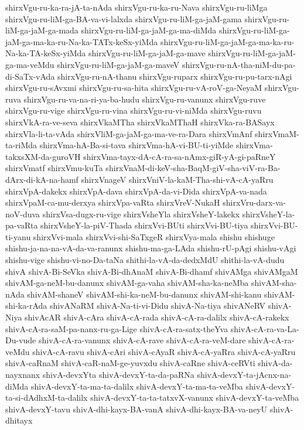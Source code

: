 {shirxVgu-ru-ka-ra-jA-ta-nAda
shirxVgu-ru-ka-ru-Nava
shirxVgu-ru-liMga
shirxVgu-ru-liM-ga-BA-va-vi-lalxda
shirxVgu-ru-liM-ga-jaM-gama
shirxVgu-ru-liM-ga-jaM-ga-mada
shirxVgu-ru-liM-ga-jaM-ga-ma-diMda
shirxVgu-ru-liM-ga-jaM-ga-ma-ka-ru-Na-ka-TATx-keSx-yiMda
shirxVgu-ru-liM-ga-jaM-ga-ma-ka-ru-Na-ka-TA-keSx-yiMda
shirxVgu-ru-liM-ga-jaM-ga-mave
shirxVgu-ru-liM-ga-jaM-ga-ma-veMdu
shirxVgu-ru-liM-ga-jaM-ga-maveV
shirxVgu-ru-nA-tha-niM-du-pa-di-SaTx-vAda
shirxVgu-ru-nA-thanu
shirxVgu-ruparx
shirxVgu-ru-pu-tarx-nAgi
shirxVgu-ru-sAvxmi
shirxVgu-ru-sa-hita
shirxVgu-ru-vA-roV-ga-NeyaM
shirxVgu-ruva
shirxVgu-ru-va-na-ri-ya-ba-hudu
shirxVgu-ru-vanunx
shirxVgu-ruve
shirxVgu-ru-vige
shirxVgu-ru-vina
shirxVgu-ru-vi-niMda
shirxVgu-ruvu
shirxVkA-ra-ve-seva
shirxVkaMTha
shirxVkaMThaH
shirxVka-ra-BASayx
shirxVla-li-ta-vAda
shirxVliM-ga-jaM-ga-ma-ve-ra-Dara
shirxVmAnf
shirxVmaM-ta-riMda
shirxVma-hA-Ba-si-tava
shirxVma-hA-vi-BU-ti-yiMde
shirxVma-takxsXM-da-guroVH
shirxVma-tayx-dA-cA-ra-sa-nAmx-giR-yA-gi-paRneY
shirxVmatf
shirxVmu-kuTa
shirxVnaM-di-keV-sha-BaqM-giV-sha-viV-ra-Ba-dArx-di-kA-na-hamf
shirxVnageV
shirxVniV-la-kaM-Tha-shi-vA-cA-yaRru
shirxVpA-dakekx
shirxVpA-dava
shirxVpA-da-vi-Dida
shirxVpA-va-nada
shirxVpaM-ca-mu-derxya
shirxVpa-vaRta
shirxVreV-NukaH
shirxVru-darx-va-noV-duva
shirxVsa-dugx-ru-vige
shirxVsheYla
shirxVsheY-lakekx
shirxVsheY-la-pa-vaRta
shirxVsheY-la-piV-Thada
shirxVvi-BUti
shirxVvi-BU-tiya
shirxVvi-BU-ti-yanu
shirxVvi-mala
shirxVvi-shi-SaTxgeR
shirxVya-mala
shishu
shishuge
shishu-ja-na-na-vA-da-va-ranunx
shishu-ma-ga-LAda
shishu-rU-pAgi
shishu-vAgi
shishu-vige
shishu-vi-no-Da-taNa
shithi-la-vA-da-dedxMdU
shithi-la-vA-dudu
shivA
shivA-Bi-SeVka
shivA-Bi-dhAnaM
shivA-Bi-dhamf
shivAMga
shivAMgaM
shivAM-ga-neM-bu-danunx
shivAM-ga-vaha
shivAM-sha-ka-neMba
shivAM-sha-nAda
shivAM-shaneV
shivAM-shi-ka-neM-bu-danunx
shivAM-shi-kanu
shivAM-shi-ka-rAda
shivANaRM
shivA-Na-ti-vi-Didu
shivA-Na-tiya
shivANeRV
shivA-Niya
shivAcAR
shivA-cAra
shivA-cA-rada
shivA-cA-ra-dalilx
shivA-cA-rakekx
shivA-cA-ra-saM-pa-nanx-ru-ga-Lige
shivA-cA-ra-satx-theYva
shivA-cA-ra-va-La-Du-vude
shivA-cA-ra-vanunx
shivA-cA-rave
shivA-cA-ra-veM-dare
shivA-cA-ra-veMdu
shivA-cA-ravu
shivA-cAri
shivA-cAyaR
shivA-cA-yaRra
shivA-cA-yaRru
shivA-caRnaM
shivA-caR-naM-ge-yuvxdu
shivA-caRne
shivA-ceRVti
shivA-da-nayxnanx
shivA-devxYta
shivA-devxY-ta-da-paRNa
shivA-devxY-ta-jAcnx-na-diMda
shivA-devxY-ta-ma-ta-dalilx
shivA-devxY-ta-ma-ta-veMba
shivA-devxY-ta-si-dAdhxM-ta-dalilx
shivA-devxY-ta-ta-tatxvX-vanunx
shivA-devxY-ta-veMba
shivA-devxY-tavu
shivA-dhi-kayx-BA-vanA
shivA-dhi-kayx-BA-va-neyU
shivA-dhitayx
}
